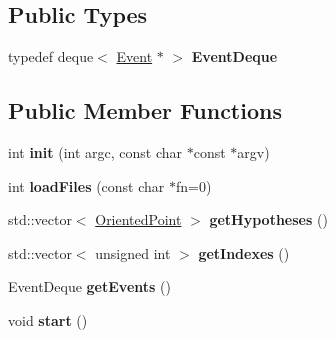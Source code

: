 \subsection*{Public Types}
\begin{DoxyCompactItemize}
\item 
\mbox{\label{structGridSlamProcessorThread_a50b35507f7044e4d53e091f63c4adffe}} 
typedef deque$<$ \hyperlink{structGridSlamProcessorThread_1_1Event}{Event} $\ast$ $>$ {\bfseries Event\+Deque}
\end{DoxyCompactItemize}
\subsection*{Public Member Functions}
\begin{DoxyCompactItemize}
\item 
\mbox{\label{structGridSlamProcessorThread_ae9ede2676d18eecf0acf07e18c4711ba}} 
int {\bfseries init} (int argc, const char $\ast$const $\ast$argv)
\item 
\mbox{\label{structGridSlamProcessorThread_ab0bb091ef9b4e69d41f9748232e50ecf}} 
int {\bfseries load\+Files} (const char $\ast$fn=0)
\item 
\mbox{\label{structGridSlamProcessorThread_abc0a700e8a01904af3ff6c6428dc6f5c}} 
std\+::vector$<$ \hyperlink{structGMapping_1_1orientedpoint}{Oriented\+Point} $>$ {\bfseries get\+Hypotheses} ()
\item 
\mbox{\label{structGridSlamProcessorThread_a866a35ca8309351d315a2a5e8baab2a4}} 
std\+::vector$<$ unsigned int $>$ {\bfseries get\+Indexes} ()
\item 
\mbox{\label{structGridSlamProcessorThread_af771f6563a1855c4c0bd0617ffd09620}} 
Event\+Deque {\bfseries get\+Events} ()
\item 
\mbox{\label{structGridSlamProcessorThread_a97dd968292d48bebddec162e121bff47}} 
void {\bfseries start} ()
\item 
\mbox{\label{structGridSlamProcessorThread_a8d9df9fcdd03ad0ec3bcc986719e7015}} 

\end{DoxyCompactItemize}
